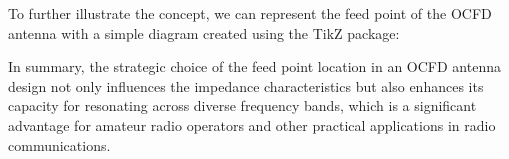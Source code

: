 To further illustrate the concept, we can represent the feed point of the OCFD antenna with a simple diagram created using the TikZ package:

\begin{center}
\end{center}

In summary, the strategic choice of the feed point location in an OCFD antenna design not only influences the impedance characteristics but also enhances its capacity for resonating across diverse frequency bands, which is a significant advantage for amateur radio operators and other practical applications in radio communications.
